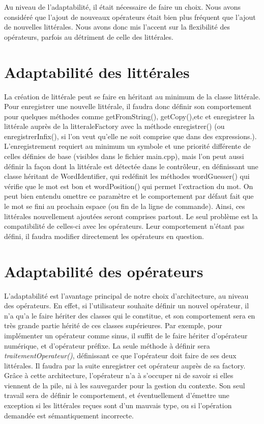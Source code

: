 Au niveau de l'adaptabilité, il était nécessaire de faire un choix. Nous avons considéré que l'ajout de nouveaux opérateurs était bien plus fréquent que l'ajout de nouvelles littérales. Nous avons donc mis l'accent sur la flexibilité des opérateurs, parfois au détriment de celle des littérales.

\section{Adaptabilité des littérales}
La création de littérale peut se faire en héritant au minimum de la classe littérale. Pour enregistrer une nouvelle littérale, il faudra donc définir son comportement pour quelques méthodes comme getFromString(), getCopy(),etc et enregistrer la littérale auprès de la litteraleFactory avec la méthode enregistrer() (ou enregistrerInfix(), si l'on veut qu'elle ne soit comprise que dans des expressions.). L'enregistrement requiert au minimum un symbole et une priorité différente de celles définies de base (visibles dans le fichier main.cpp), mais l'on peut aussi définir la façon dont la littérale est détectée dans le contrôleur, en définissant une classe héritant de WordIdentifier, qui redéfinit les méthodes wordGuesser() qui vérifie que le mot est bon et wordPosition() qui permet l'extraction du mot. On peut bien entendu omettre ce paramètre et le comportement par défaut fait que le mot se fini au prochain espace (ou fin de la ligne de commande).
Ainsi, ces littérales nouvellement ajoutées seront comprises partout. Le seul problème est la compatibilité de celles-ci avec les opérateurs. Leur comportement n'étant pas défini, il faudra modifier directement les opérateurs en question.

\section{Adaptabilité des opérateurs}

L'adaptabilité est l'avantage principal de notre choix d'architecture, au niveau des opérateurs. En effet, si l'utilisateur souhaite définir un nouvel opérateur, il n'a qu'a le faire hériter des classes qui le constitue, et son comportement sera en très grande partie hérité de ces classes supérieures. Par exemple, pour implémenter un opérateur comme sinus, il suffit de le faire hériter d'opérateur numérique, et d'opérateur préfixe. La seule méthode à définir sera \textit{traitementOperateur()}, définissant ce que l'opérateur doit faire de ses deux littérales. Il faudra par la suite enregistrer cet opérateur auprès de sa factory.
Grâce à cette architecture, l'opérateur n'a à s'occuper ni de savoir si elles viennent de la pile, ni à les sauvegarder pour la gestion du contexte. Son seul travail sera de définir le comportement, et éventuellement d'émettre une exception si les littérales reçues sont d'un mauvais type, ou si l'opération demandée est sémantiquement incorrecte.

